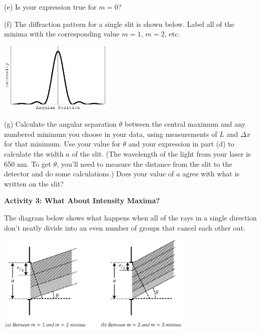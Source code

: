 (e) Is your expression true for $m=0$?
\answerspace{0.4in}

(f) The diffraction pattern for a single slit is shown below.  Label all of the minima with the corresponding value $m=1$, $m=2$, etc.  

\begin{center}
\includegraphics[width=0.4\textwidth]{diffraction_of_light/diffraction_of_light_fig_3.eps}
\end{center}

\pagebreak[3]

(g) Calculate the angular separation $\theta$ between the central maximum and any numbered minimum you choose in your data, using measurements of $L$ and $\Delta x$ for that minimum.  Use your value for $\theta$ and your expression in part (d) to calculate the width $a$ of the slit.  (The wavelength of the light from your laser is 650 nm.  To get $\theta$, you'll need to measure the distance from the slit to the detector and do some calculations.)    Does your value of $a$ agree with what is written on the slit?
\answerspace{1.0in}


\textbf{Activity 3: What About Intensity Maxima?}

The diagram below shows what happens when all of the rays in a single direction don't neatly divide into an even number of groups that cancel each other out.

\vspace{-0.2in}
\begin{center}
\includegraphics[width=0.7\textwidth]{diffraction_of_light/diffraction_maxima.eps}
\end{center}
\vspace{-0.2in}


